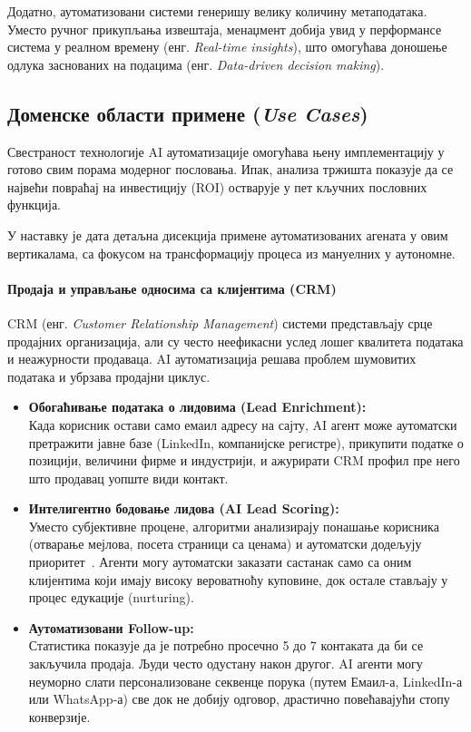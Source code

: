 Додатно, аутоматизовани системи генеришу велику количину метаподатака. Уместо ручног прикупљања извештаја, менаџмент добија увид у перформансе система у реалном времену (енг. \textit{Real-time insights}), што омогућава доношење одлука заснованих на подацима (енг. \textit{Data-driven decision making}).

\subsection{Доменске области примене (\textit{Use Cases})}

Свестраност технологије AI аутоматизације омогућава њену имплементацију у готово свим порама модерног пословања. Ипак, анализа тржишта показује да се највећи повраћај на инвестицију (ROI) остварује у пет кључних пословних функција.

У наставку је дата детаљна дисекција примене аутоматизованих агената у овим вертикалама, са фокусом на трансформацију процеса из мануелних у аутономне.

\paragraph*{Продаја и управљање односима са клијентима (CRM)}
\noindent
CRM (енг. \textit{Customer Relationship Management}) системи представљају срце продајних организација, али су често неефикасни услед лошег квалитета података и неажурности продаваца. AI аутоматизација решава проблем шумовитих података и убрзава продајни циклус.

\begin{itemize}
    \item \textbf{Обогаћивање података о лидовима (Lead Enrichment):} \\
    Када корисник остави само емаил адресу на сајту, AI агент може аутоматски претражити јавне базе (LinkedIn, компанијске регистре), прикупити податке о позицији, величини фирме и индустрији, и ажурирати CRM профил пре него што продавац уопште види контакт.
    
    \item \textbf{Интелигентно бодовање лидова (AI Lead Scoring):} \\
    Уместо субјективне процене, алгоритми анализирају понашање корисника (отварање мејлова, посета страници са ценама) и аутоматски додељују приоритет~\cite{raffel2020t5,wolf2020transformers}. Агенти могу аутоматски заказати састанак само са оним клијентима који имају високу вероватноћу куповине, док остале стављају у процес едукације (nurturing).
    
    \item \textbf{Аутоматизовани Follow-up:} \\
    Статистика показује да је потребно просечно 5 до 7 контаката да би се закључила продаја. Људи често одустану након другог. AI агенти могу неуморно слати персонализоване секвенце порука (путем Емаил-а, LinkedIn-а или WhatsApp-а) све док не добију одговор, драстично повећавајући стопу конверзије.
\end{itemize}

